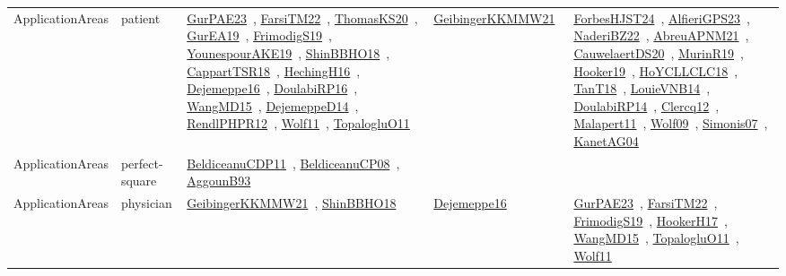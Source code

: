 {\begin{longtable}{lp{3cm}>{\raggedright\arraybackslash}p{6cm}>{\raggedright\arraybackslash}p{6cm}>{\raggedright\arraybackslash}p{8cm}}
ApplicationAreas & patient & \href{works/GurPAE23.pdf}{GurPAE23}~\cite{GurPAE23}, \href{works/FarsiTM22.pdf}{FarsiTM22}~\cite{FarsiTM22}, \href{works/ThomasKS20.pdf}{ThomasKS20}~\cite{ThomasKS20}, \href{works/GurEA19.pdf}{GurEA19}~\cite{GurEA19}, \href{works/FrimodigS19.pdf}{FrimodigS19}~\cite{FrimodigS19}, \href{works/YounespourAKE19.pdf}{YounespourAKE19}~\cite{YounespourAKE19}, \href{works/ShinBBHO18.pdf}{ShinBBHO18}~\cite{ShinBBHO18}, \href{works/CappartTSR18.pdf}{CappartTSR18}~\cite{CappartTSR18}, \href{works/HechingH16.pdf}{HechingH16}~\cite{HechingH16}, \href{works/Dejemeppe16.pdf}{Dejemeppe16}~\cite{Dejemeppe16}, \href{works/DoulabiRP16.pdf}{DoulabiRP16}~\cite{DoulabiRP16}, \href{works/WangMD15.pdf}{WangMD15}~\cite{WangMD15}, \href{works/DejemeppeD14.pdf}{DejemeppeD14}~\cite{DejemeppeD14}, \href{works/RendlPHPR12.pdf}{RendlPHPR12}~\cite{RendlPHPR12}, \href{works/Wolf11.pdf}{Wolf11}~\cite{Wolf11}, \href{works/TopalogluO11.pdf}{TopalogluO11}~\cite{TopalogluO11} & \href{works/GeibingerKKMMW21.pdf}{GeibingerKKMMW21}~\cite{GeibingerKKMMW21} & \href{works/ForbesHJST24.pdf}{ForbesHJST24}~\cite{ForbesHJST24}, \href{works/AlfieriGPS23.pdf}{AlfieriGPS23}~\cite{AlfieriGPS23}, \href{works/NaderiBZ22.pdf}{NaderiBZ22}~\cite{NaderiBZ22}, \href{works/AbreuAPNM21.pdf}{AbreuAPNM21}~\cite{AbreuAPNM21}, \href{works/CauwelaertDS20.pdf}{CauwelaertDS20}~\cite{CauwelaertDS20}, \href{works/MurinR19.pdf}{MurinR19}~\cite{MurinR19}, \href{works/Hooker19.pdf}{Hooker19}~\cite{Hooker19}, \href{works/HoYCLLCLC18.pdf}{HoYCLLCLC18}~\cite{HoYCLLCLC18}, \href{works/TanT18.pdf}{TanT18}~\cite{TanT18}, \href{works/LouieVNB14.pdf}{LouieVNB14}~\cite{LouieVNB14}, \href{works/DoulabiRP14.pdf}{DoulabiRP14}~\cite{DoulabiRP14}, \href{works/Clercq12.pdf}{Clercq12}~\cite{Clercq12}, \href{works/Malapert11.pdf}{Malapert11}~\cite{Malapert11}, \href{works/Wolf09.pdf}{Wolf09}~\cite{Wolf09}, \href{works/Simonis07.pdf}{Simonis07}~\cite{Simonis07}, \href{works/KanetAG04.pdf}{KanetAG04}~\cite{KanetAG04}\\
ApplicationAreas & perfect-square & \href{works/BeldiceanuCDP11.pdf}{BeldiceanuCDP11}~\cite{BeldiceanuCDP11}, \href{works/BeldiceanuCP08.pdf}{BeldiceanuCP08}~\cite{BeldiceanuCP08}, \href{works/AggounB93.pdf}{AggounB93}~\cite{AggounB93} &  & \\
ApplicationAreas & physician & \href{works/GeibingerKKMMW21.pdf}{GeibingerKKMMW21}~\cite{GeibingerKKMMW21}, \href{works/ShinBBHO18.pdf}{ShinBBHO18}~\cite{ShinBBHO18} & \href{works/Dejemeppe16.pdf}{Dejemeppe16}~\cite{Dejemeppe16} & \href{works/GurPAE23.pdf}{GurPAE23}~\cite{GurPAE23}, \href{works/FarsiTM22.pdf}{FarsiTM22}~\cite{FarsiTM22}, \href{works/FrimodigS19.pdf}{FrimodigS19}~\cite{FrimodigS19}, \href{works/HookerH17.pdf}{HookerH17}~\cite{HookerH17}, \href{works/WangMD15.pdf}{WangMD15}~\cite{WangMD15}, \href{works/TopalogluO11.pdf}{TopalogluO11}~\cite{TopalogluO11}, \href{works/Wolf11.pdf}{Wolf11}~\cite{Wolf11}\\

\end{longtable}}
